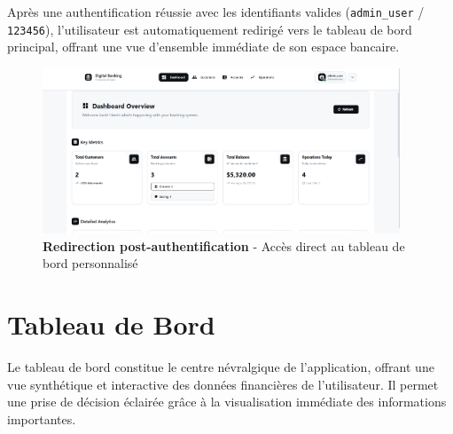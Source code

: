 \documentclass[10pt]{article}
\begin{document}
\begin{infobox}[title=Authentification réussie]
    Après une authentification réussie avec les identifiants valides (\texttt{admin\_user} / \texttt{123456}), 
    l'utilisateur est automatiquement redirigé vers le tableau de bord principal, offrant une vue 
    d'ensemble immédiate de son espace bancaire.
\end{infobox}

\begin{figure}[h]
    \centering
    \vspace{1cm}
    \begin{imagebox}
        \includegraphics[width=0.95\textwidth]{screenshots/01_03_login_successful_dashboard.png}
    \end{imagebox}
    \caption{\textbf{Redirection post-authentification} - Accès direct au tableau de bord personnalisé}
    \label{fig:login_successful}
    \vspace{0.8cm}
\end{figure}


\newpage


\section{Tableau de Bord}

\sectiondivider

\begin{successbox}[title=Centre de contrôle utilisateur]
    Le tableau de bord constitue le centre névralgique de l'application, offrant une vue 
    synthétique et interactive des données financières de l'utilisateur. Il permet une 
    prise de décision éclairée grâce à la visualisation immédiate des informations importantes.
\end{successbox}
\end{document}
